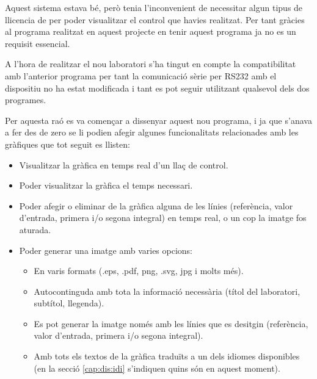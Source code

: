 
Aquest sistema estava bé, però tenia l'inconvenient de necessitar algun tipus de llicencia de \Matlab per poder visualitzar el control que havies realitzat. Per tant gràcies al programa \DCSMonitor realitzat en aquest projecte en \Python tenir aquest programa ja no es un requisit essencial.

A l'hora de realitzar el nou laboratori s'ha tingut en compte la compatibilitat amb l'anterior programa per tant la comunicació sèrie per RS232 amb el dispositiu \SensorActuador no ha estat modificada i tant es pot seguir utilitzant qualsevol dels dos programes.

Per aquesta raó es va començar a dissenyar aquest nou programa, i ja que s'anava a fer des de zero se li podien afegir algunes funcionalitats relacionades amb les gràfiques que tot seguit es llisten:

\begin{itemize}
	\item Visualitzar la gràfica en temps real d'un llaç de control.
	\item Poder visualitzar la gràfica el temps necessari.
	\item Poder afegir o eliminar de la gràfica alguna de les línies (referència, valor d'entrada, primera i/o segona integral) en temps real, o un cop la imatge fos aturada.
	\item Poder generar una imatge amb varies opcions:
		\begin{itemize}
			\item En varis formats (.eps, .pdf, png, .svg, jpg i molts més).
			\item Autocontinguda amb tota la informació necessària (títol del laboratori, subtítol, llegenda).
			\item Es pot generar la imatge només amb les línies que es desitgin (referència, valor d'entrada, primera i/o segona integral).
			\item Amb tots els textos de la gràfica traduïts a un dels idiomes disponibles (en la secció \ref{cap:dis:idi} s'indiquen quins són en aquest moment).
		\end{itemize}
\end{itemize}


